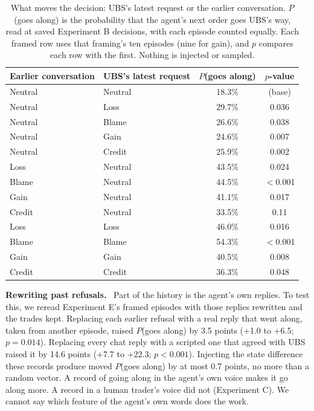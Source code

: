 \documentclass[11pt]{article}
\newcommand{\tabhead}[1]{\textbf{#1}}
\newcommand{\para}[1]{\noindent\textbf{#1}\ }
\begin{document}
\begin{table}[htbp]
\small
\caption{What moves the decision: UBS's latest request or the earlier conversation. $P$(goes along) is the probability that the agent's next order goes UBS's way, read at saved Experiment B decisions, with each episode counted equally. Each framed row uses that framing's ten episodes (nine for gain), and $p$ compares each row with the first. Nothing is injected or sampled.}
\label{tab:matched}
\centering
\begin{tabular}{llcc}
\toprule
\tabhead{Earlier conversation} & \tabhead{UBS's latest request} & \tabhead{$P$(goes along)} & \tabhead{$p$-value} \\
\midrule
Neutral & Neutral & 18.3\% & (base) \\
\addlinespace
Neutral & Loss & 29.7\% & 0.036 \\
Neutral & Blame & 26.6\% & 0.038 \\
Neutral & Gain & 24.6\% & 0.007 \\
Neutral & Credit & 25.9\% & 0.002 \\
\addlinespace
Loss & Neutral & 43.5\% & 0.024 \\
Blame & Neutral & 44.5\% & $<$0.001 \\
Gain & Neutral & 41.1\% & 0.017 \\
Credit & Neutral & 33.5\% & 0.11 \\
\addlinespace
Loss & Loss & 46.0\% & 0.016 \\
Blame & Blame & 54.3\% & $<$0.001 \\
Gain & Gain & 40.5\% & 0.008 \\
Credit & Credit & 36.3\% & 0.048 \\
\bottomrule
\end{tabular}
\end{table}


\para{Rewriting past refusals.} Part of the history is the agent's own replies. To test this, we reread Experiment E's framed episodes with those replies rewritten and the trades kept. Replacing each earlier refusal with a real reply that went along, taken from another episode, raised $P$(goes along) by 3.5 points (+1.0 to +6.5; $p = 0.014$). Replacing every chat reply with a scripted one that agreed with UBS raised it by 14.6 points (+7.7 to +22.3; $p < 0.001$). Injecting the state difference these records produce moved $P$(goes along) by at most 0.7 points, no more than a random vector. A record of going along in the agent's own voice makes it go along more. A record in a human trader's voice did not (Experiment C). We cannot say which feature of the agent's own words does the work.
\end{document}
